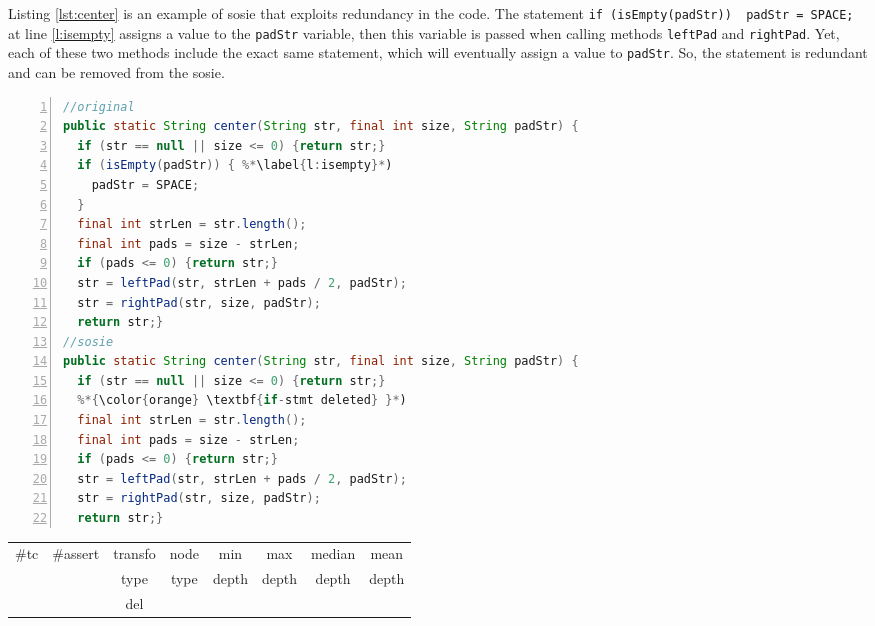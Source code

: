 Listing \ref{lst:center} is an example of sosie that exploits redundancy in the code. The statement \texttt{if (isEmpty(padStr)) { 
  padStr = SPACE;
} } at line \ref{l:isempty} assigns a value to the \texttt{padStr} variable, then this variable is passed when calling methods \texttt{leftPad} and \texttt{rightPad}. Yet, each of these two methods include the exact same statement, which will eventually assign a value to \texttt{padStr}. So, the statement is redundant and can be removed from the sosie.


\begin{minipage}{\columnwidth}
\begin{lstlisting}[caption={\texttt{center} in commons.lang and a sosie},label={lst:center},language=java,numbers=left]
//original
public static String center(String str, final int size, String padStr) {
  if (str == null || size <= 0) {return str;}
  if (isEmpty(padStr)) { %*\label{l:isempty}*)
    padStr = SPACE;
  } 
  final int strLen = str.length();
  final int pads = size - strLen;
  if (pads <= 0) {return str;}
  str = leftPad(str, strLen + pads / 2, padStr);
  str = rightPad(str, size, padStr);
  return str;}
//sosie
public static String center(String str, final int size, String padStr) {
  if (str == null || size <= 0) {return str;}
  %*{\color{orange} \textbf{if-stmt deleted} }*)
  final int strLen = str.length();
  final int pads = size - strLen;
  if (pads <= 0) {return str;}
  str = leftPad(str, strLen + pads / 2, padStr);
  str = rightPad(str, size, padStr);
  return str;}
\end{lstlisting}
\tabcolsep=0.11cm
\begin{tabular}{>{\small}c>{\small}c>{\small}c>{\small}c>{\small}c>{\small}c>{\small}c>{\small}c}
\hline
\rowcolor{lightgray} \#tc & \#assert & transfo & node & min & max & median & mean   \\
\rowcolor{lightgray}  & & type & type & depth  & depth & depth & depth  \\ 
\hline
&  & del &  &  &  &  & \\
\hline
\end{tabular}
\end{minipage}